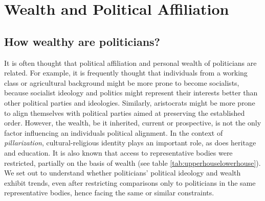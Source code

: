 
\section{Wealth and Political Affiliation}

\subsection{How wealthy are politicians?}

    It is often thought that political affiliation and personal wealth of politicians are related. For example, it is frequently thought that individuals from a working class or agricultural background might be more prone to become socialists, because socialist ideology and politics might represent their interests better than other political parties and ideologies. Similarly, aristocrats might be more prone to align themselves with political parties aimed at preserving the established order. However, the wealth, be it inherited, current or prospective, is not the only factor influencing an individuals political alignment. In the context of \textit{pillarization}, cultural-religious identity plays an important role, as does heritage and education. It is also known that access to representative bodies were restricted, partially on the basis of wealth (see table \ref{tab:upperhouselowerhouse}). We set out to understand whether politicians' political ideology and wealth exhibit trends, even after restricting comparisons only to politicians in the same representative bodies, hence facing the same or similar constraints. 

